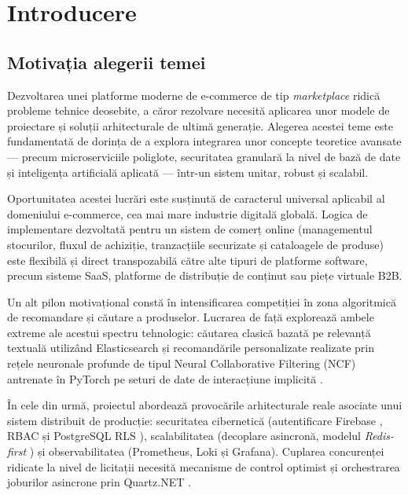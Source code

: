 \chapter{Introducere}

\section{Motivația alegerii temei}

Dezvoltarea unei platforme moderne de e-commerce de tip \textit{marketplace} ridică probleme tehnice deosebite, a căror rezolvare necesită aplicarea unor modele de proiectare și soluții arhitecturale de ultimă generație. Alegerea acestei teme este fundamentată de dorința de a explora integrarea unor concepte teoretice avansate --- precum microserviciile poliglote, securitatea granulară la nivel de bază de date și inteligența artificială aplicată --- într-un sistem unitar, robust și scalabil.

Oportunitatea acestei lucrări este susținută de caracterul universal aplicabil al domeniului e-commerce, cea mai mare industrie digitală globală. Logica de implementare dezvoltată pentru un sistem de comerț online (managementul stocurilor, fluxul de achiziție, tranzacțiile securizate și cataloagele de produse) este flexibilă și direct transpozabilă către alte tipuri de platforme software, precum sisteme SaaS, platforme de distribuție de conținut sau piețe virtuale B2B.

Un alt pilon motivațional constă în intensificarea competiției în zona algoritmică de recomandare și căutare a produselor. Lucrarea de față explorează ambele extreme ale acestui spectru tehnologic: căutarea clasică bazată pe relevanță textuală utilizând Elasticsearch \cite{elasticsearch2026search} și recomandările personalizate realizate prin rețele neuronale profunde de tipul Neural Collaborative Filtering (NCF) antrenate în PyTorch pe seturi de date de interacțiune implicită \cite{he2017ncf}.

În cele din urmă, proiectul abordează provocările arhitecturale reale asociate unui sistem distribuit de producție: securitatea cibernetică (autentificare Firebase \cite{firebase2026auth}, RBAC și PostgreSQL RLS \cite{postgresql2026rls}), scalabilitatea (decoplare asincronă, modelul \textit{Redis-first} \cite{redis2026watch}) și observabilitatea (Prometheus, Loki și Grafana). Cuplarea concurenței ridicate la nivel de licitații necesită mecanisme de control optimist și orchestrarea joburilor asincrone prin Quartz.NET \cite{quartz2026jobs}.

